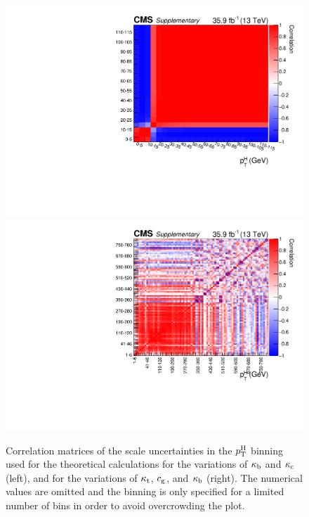 \begin{figure}[hbtp]
  \begin{center}
    \includegraphics[width=\halflinewidth]{img/interpretation/other/corrmat_theorybinning_yukawa.pdf}
    \includegraphics[width=\halflinewidth]{img/interpretation/other/corrmat_theorybinning_tophighpt.pdf}
    \caption{
        Correlation matrices of the scale uncertainties in the $p_\mathrm{T}^\mathrm{H}$ binning used for the theoretical calculations for the variations of $\kappa_{\mathrm{b}}$ and $\kappa_{\mathrm{c}}$ (left), and for the variations of $\kappa_{\mathrm{t}}$, $c_\mathrm{g}$, and $\kappa_{\mathrm{b}}$ (right).
        The numerical values are omitted and the binning is only specified for a limited number of bins in order to avoid overcrowding the plot.
        }
    \label{fig:scalecorrelationmatrices-theory}
  \end{center}
\end{figure}


